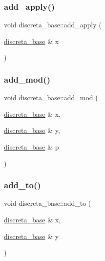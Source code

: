 \mbox{\label{classdiscreta__base_a1e8b73324062c6ff9e01aaf5fb6e8fba}} 
\subsubsection{\texorpdfstring{add\+\_\+apply()}{add\_apply()}}
{\footnotesize\ttfamily void discreta\+\_\+base\+::add\+\_\+apply (\begin{DoxyParamCaption}\item[{\mbox{\hyperlink{classdiscreta__base}{discreta\+\_\+base}} \&}]{x }\end{DoxyParamCaption})}

\mbox{\label{classdiscreta__base_aa8864b3f228cad737b2f3ff469bd8f63}} 
\subsubsection{\texorpdfstring{add\+\_\+mod()}{add\_mod()}}
{\footnotesize\ttfamily void discreta\+\_\+base\+::add\+\_\+mod (\begin{DoxyParamCaption}\item[{\mbox{\hyperlink{classdiscreta__base}{discreta\+\_\+base}} \&}]{x,  }\item[{\mbox{\hyperlink{classdiscreta__base}{discreta\+\_\+base}} \&}]{y,  }\item[{\mbox{\hyperlink{classdiscreta__base}{discreta\+\_\+base}} \&}]{p }\end{DoxyParamCaption})}

\mbox{\label{classdiscreta__base_a712a61311eb036d70a52871ed315f515}} 
\subsubsection{\texorpdfstring{add\+\_\+to()}{add\_to()}}
{\footnotesize\ttfamily void discreta\+\_\+base\+::add\+\_\+to (\begin{DoxyParamCaption}\item[{\mbox{\hyperlink{classdiscreta__base}{discreta\+\_\+base}} \&}]{x,  }\item[{\mbox{\hyperlink{classdiscreta__base}{discreta\+\_\+base}} \&}]{y }\end{DoxyParamCaption})\hspace{0.3cm}{\ttfamily [virtual]}}



